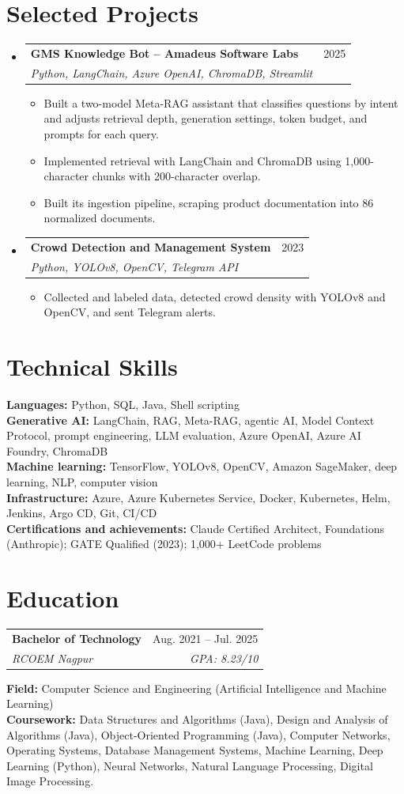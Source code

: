 \documentclass[a4paper,11pt]{article}
\makeatletter
\newcommand{\entry}[4]{\item\begin{tabularx}{\textwidth}{@{}Xr@{}}\textbf{#1}& #2\\\textit{\small #3}&\textit{\small #4}\end{tabularx}\vspace{-5pt}}
\newcommand{\bulletpoint}[1]{\item\small{#1}}
\makeatother
\begin{document}
\section{Selected Projects}
\begin{itemize}[leftmargin=0in,label={}]
  \entry{GMS Knowledge Bot -- Amadeus Software Labs}{2025}{Python, LangChain, Azure OpenAI, ChromaDB, Streamlit}{}
  \begin{itemize}
    \bulletpoint{Built a two-model Meta-RAG assistant that classif{}ies questions by intent and adjusts retrieval depth, generation settings, token budget, and prompts for each query.}
    \bulletpoint{Implemented retrieval with LangChain and ChromaDB using 1,000-character chunks with 200-character overlap.}
    \bulletpoint{Built its ingestion pipeline, scraping product documentation into 86 normalized documents.}
  \end{itemize}
  \entry{Crowd Detection and Management System}{2023}{Python, YOLOv8, OpenCV, Telegram API}{}
  \begin{itemize}
    \bulletpoint{Collected and labeled data, detected crowd density with YOLOv8 and OpenCV, and sent Telegram alerts.}
  \end{itemize}
\end{itemize}

\section{Technical Skills}
\small\textbf{Languages:} Python, SQL, Java, Shell scripting \\
\textbf{Generative AI:} LangChain, RAG, Meta-RAG, agentic AI, Model Context Protocol, prompt engineering, LLM evaluation, Azure OpenAI, Azure AI Foundry, ChromaDB \\
\textbf{Machine learning:} TensorFlow, YOLOv8, OpenCV, Amazon SageMaker, deep learning, NLP, computer vision \\
\textbf{Infrastructure:} Azure, Azure Kubernetes Service, Docker, Kubernetes, Helm, Jenkins, Argo CD, Git, CI/CD \\
\textbf{Certif{}ications and achievements:} Claude Certif{}ied Architect, Foundations (Anthropic); GATE Qualif{}ied (2023); 1,000+ LeetCode problems

\section{Education}
\begin{tabularx}{\textwidth}{@{}Xr@{}}
  \textbf{Bachelor of Technology} & Aug. 2021 -- Jul. 2025 \\
  \textit{\small RCOEM Nagpur} & \textit{\small GPA: 8.23/10} \\
\end{tabularx}
\small\textbf{Field:} Computer Science and Engineering (Artif{}icial Intelligence and Machine Learning)\\
\small\textbf{Coursework:} Data Structures and Algorithms (Java), Design and Analysis of Algorithms (Java), Object-Oriented Programming (Java), Computer Networks, Operating Systems, Database Management Systems, Machine Learning, Deep Learning (Python), Neural Networks, Natural Language Processing, Digital Image Processing.
\end{document}
